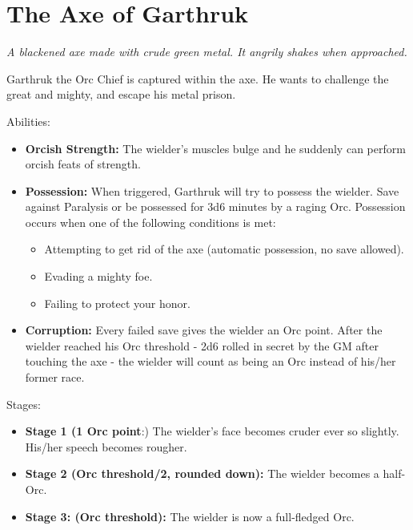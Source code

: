 \documentclass[letterpaper,sansserif,tightsqueeze]{rpg-module}
\begin{document}
\section{The Axe of Garthruk}
\textit{A blackened axe made with crude green metal. It angrily shakes when approached.}

Garthruk the Orc Chief is captured within the axe. He wants to challenge the great and mighty, and escape his metal prison.

Abilities:
\begin{itemize}
	\item \textbf{Orcish Strength:} The wielder's muscles bulge and he suddenly can perform orcish feats of strength.
	\item \textbf{Possession:} When triggered, Garthruk will try to possess the wielder. Save against Paralysis or be possessed for 3d6 minutes by a raging Orc. Possession occurs when one of the following conditions is met:
	\begin{itemize}
		\item Attempting to get rid of the axe (automatic possession, no save allowed).
		\item Evading a mighty foe.
		\item Failing to protect your honor.
	\end{itemize}
	\item \textbf{Corruption:} Every failed save gives the wielder an Orc point. After the wielder reached his Orc threshold - 2d6 rolled in secret by the GM after touching the axe - the wielder will count as being an Orc instead of his/her former race.
\end{itemize}
Stages: 
\begin{itemize}
	\item \textbf{Stage 1 (1 Orc point}:) The wielder's face becomes cruder ever so slightly. His/her speech becomes rougher. 
	\item \textbf{Stage 2 (Orc threshold/2, rounded down):} The wielder becomes a half-Orc.
	\item \textbf{Stage 3: (Orc threshold):} The wielder is now a full-fledged Orc.
\end{itemize}
\end{document}
